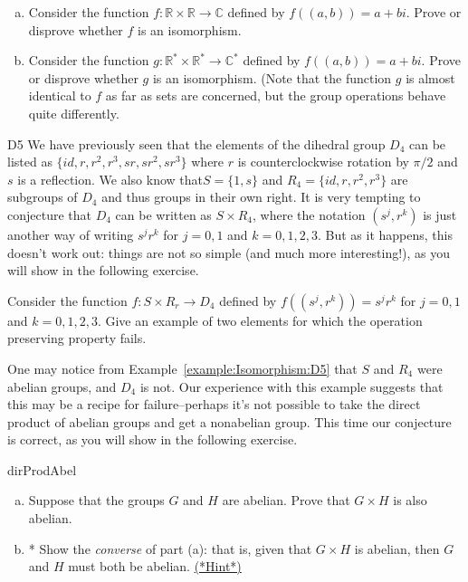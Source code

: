 \begin{exercise}{}
\begin{enumerate}[(a)]
\item
Consider the function $f: {\mathbb R} \times {\mathbb R} \rightarrow {\mathbb C}$ defined by $f( (a,b) ) = a + bi$.  Prove or disprove whether $f$ is an isomorphism. 
\item
Consider the function $g: {\mathbb R}^* \times {\mathbb R}^* \rightarrow {\mathbb C}^* $ defined by $f( (a,b) ) = a + bi$.  Prove or disprove whether $g$ is an isomorphism. (Note that the function $g$ 
is almost identical to $f$ as far as sets are concerned, but the group operations behave quite differently. 
\end{enumerate}
\end{exercise}

\begin{example}{D5}
We have previously seen that the elements of the dihedral group $D_4$ can be listed as $\{id, r,r^2, r^3, sr,sr^2, sr^3 \}$ where $r$ is counterclockwise rotation by $\pi/2$ and $s$ is a reflection. We also know that$S=\{1,s\}$ and  $R_4 = \{id, r, r^2, r^3 \}$ are subgroups of $D_4$ and thus groups in their own right. It is very tempting to conjecture that $D_4$ can be written as $S \times R_4$,  where the notation $(s^j,r^k)$ is just another way of writing $s^j r^k$ for $j=0,1$ and $k = 0,1,2,3$.  But as it happens, this doesn't work out: things are not so simple (and much more interesting!), as you will show in the following exercise.
\end{example}

\begin{exercise}{}
Consider the function $f: S \times R_r \rightarrow D_4$ defined by $f( (s^j,r^k) ) =s^j r^k$ for $j=0,1$ and $k=0,1,2,3$.  Give an example of two elements for which the operation preserving property fails. 
\end{exercise}

One may notice from Example~\ref{example:Isomorphism:D5} that $S$ and $R_4$ were abelian groups, and $D_4$ is not. Our experience with this example suggests that this may be a recipe for failure--perhaps it's not possible to take the direct product of abelian groups
and get a nonabelian group.  This time our conjecture is correct, as you will show in the following exercise.

\begin{exercise}{dirProdAbel}
\begin{enumerate}[(a)]
\item
Suppose that the groups $G$  and $H$ are abelian. Prove that $G \times H$ is also abelian.
\item
* Show the \emph{converse} of part (a): that is, given that $G \times H$ is abelian, then $G$ and $H$ must both be abelian. \hyperref[sec:Isomorphism:hints]{(*Hint*)}
\end{enumerate}
\end{exercise}

